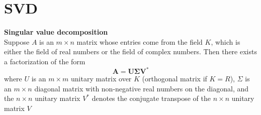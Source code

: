 \chapter{SVD}
\begin{theorem}
\textbf{Singular value decomposition}\\
Suppose $A$ is an $m \times n$ matrix whose entries come from the field $K$, which is either the field of real numbers or the field of complex numbers.
Then there exists a factorization of the form
$$
\mathbf{A} = \mathbf{U} \boldsymbol{\Sigma} \mathbf{V}^*
$$
where $U$ is an $m \times m$ unitary matrix over $K$ (orthogonal matrix if $K = R$),
$Σ$ is an $m \times n$ diagonal matrix with non-negative real numbers on the diagonal,
and the $n \times n$ unitary matrix $V^*$ denotes the conjugate transpose of the $n \times n$ unitary matrix $V$
\end{theorem}
